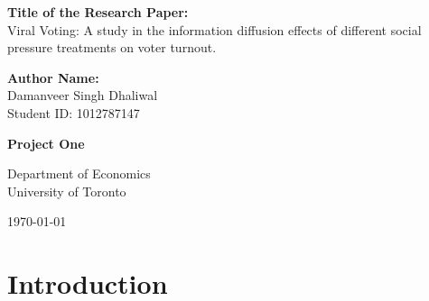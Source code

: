 \documentclass[11pt]{article}
\begin{document}
\begin{titlepage}
    \centering
    \vspace*{2cm}
    
    \vspace{0.5cm}

    \Large{\textbf{Title of the Research Paper:}}\\
    Viral Voting: A study in the information diffusion effects of different social pressure treatments on voter turnout.
    
    \vspace{0.5cm}

    \Large{\textbf{Author Name:}}\\
    \Large{Damanveer Singh Dhaliwal}\\
    \Large{Student ID: 1012787147}

    \vspace{0.5cm}
    
    \Large{\textbf{Project One}}
    
    \vfill
    
    \large{Department of Economics}\\
    \large{University of Toronto}
    
    \vspace{0.8cm}
    
    \large{\today}
    
\end{titlepage}

\section{Introduction}




\end{document}
